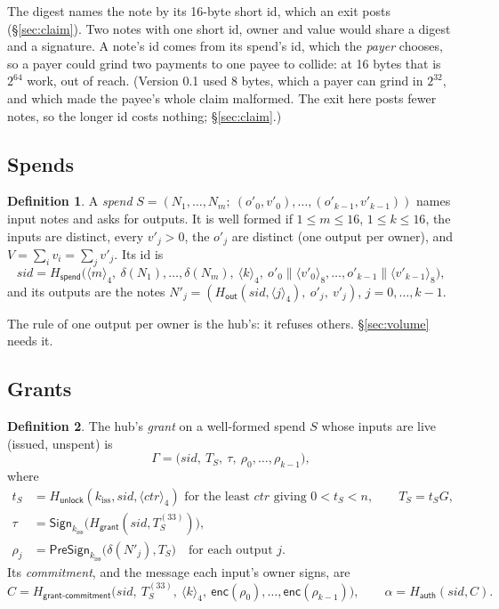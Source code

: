 \documentclass[11pt]{article}
\theoremstyle{plain}
\theoremstyle{definition}
\newtheorem{definition}{Definition}
\newcommand{\be}[2]{\langle #1\rangle_{#2}}
\newcommand{\Ht}[1]{H_{\textsf{#1}}}
\newcommand{\Sign}{\mathsf{Sign}}
\newcommand{\PSign}{\mathsf{PreSign}}
\newcommand{\kiss}{k_{\mathrm{iss}}}
\newcommand{\sid}{\mathit{sid}}
\newcommand{\enc}{\mathsf{enc}}
\begin{document}
The digest names the note by its 16-byte short id, which an exit posts
(\S\ref{sec:claim}). Two notes with one short id, owner and value would
share a digest and a signature. A note's id comes from its spend's id,
which the \emph{payer} chooses, so a payer could grind two payments to
one payee to collide: at 16 bytes that is $2^{64}$ work, out of reach.
(Version 0.1 used 8 bytes, which a payer can grind in $2^{32}$, and
which made the payee's whole claim malformed. The exit here posts
fewer notes, so the longer id costs nothing; \S\ref{sec:claim}.)

\subsection{Spends}

\begin{definition}
A \emph{spend} $S = (N_1, \dots, N_m;\ (o'_0, v'_0), \dots, (o'_{k-1},
v'_{k-1}))$ names input notes and asks for outputs. It is well formed if
$1 \le m \le 16$, $1 \le k \le 16$, the inputs are distinct, every
$v'_j > 0$, the $o'_j$ are distinct (one output per owner), and $V =
\sum_i v_i = \sum_j v'_j$. Its id is
\[
  \sid = \Ht{spend}\big(\be{m}{4},\ \delta(N_1), \dots, \delta(N_m),\
  \be{k}{4},\ o'_0 \| \be{v'_0}{8}, \dots, o'_{k-1} \| \be{v'_{k-1}}{8}\big),
\]
and its outputs are the notes $N'_j = (\Ht{out}(\sid, \be{j}{4}),\ o'_j,\
v'_j)$, $j = 0, \dots, k-1$.
\end{definition}

The rule of one output per owner is the hub's: it refuses others.
\S\ref{sec:volume} needs it.

\subsection{Grants}\label{sec:grant}

\begin{definition}
The hub's \emph{grant} on a well-formed spend $S$ whose inputs are live
(issued, unspent) is
\[
  \Gamma = \big(\sid,\ T_S,\ \tau,\ \rho_0, \dots, \rho_{k-1}\big),
\]
where
\begin{align*}
  t_S &= \Ht{unlock}(\kiss, \sid, \be{\mathit{ctr}}{4}) \text{ for the
  least } \mathit{ctr} \text{ giving } 0 < t_S < n, \qquad T_S = t_SG,\\
  \tau &= \Sign_{\kiss}\big(\Ht{grant}(\sid, T_S^{(33)})\big),\\
  \rho_j &= \PSign_{\kiss}\big(\delta(N'_j), T_S\big)\quad \text{for each output } j.
\end{align*}
Its \emph{commitment}, and the message each input's owner signs, are
\[
  C = \Ht{grant-commitment}\big(\sid,\ T_S^{(33)},\ \be{k}{4},\
  \enc(\rho_0), \dots, \enc(\rho_{k-1})\big),\qquad
  \alpha = \Ht{auth}(\sid, C).
\]
\end{definition}
\end{document}
